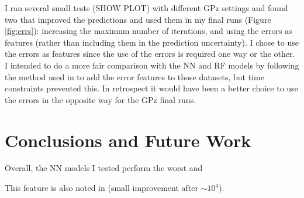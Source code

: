 \documentclass[13pt]{amsart}
\begin{document}

      I ran several small tests (SHOW PLOT) with different GPz settings and found two that improved the predictions and used them in my final runs (Figure \ref{fig:errs}): increasing the maximum number of iterations, and using the errors as features (rather than including them in the prediction uncertainty). I chose to use the errors as features since the use of the errors is required one way or the other. I intended to do a more fair comparison with the NN and RF models by following the method used in \cite{graham} to add the error features to those datasets, but time constraints prevented this. In retrospect it would have been a better choice to use the errors in the opposite way for the GPz final runs.




\section{Conclusions and Future Work}


  Overall, the NN models I tested perform the worst and

  This feature is also noted in \cite{gpz} (small improvement after $\sim 10^4$).
\end{document}
